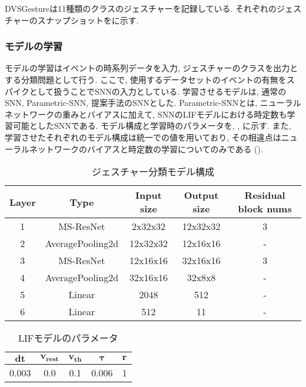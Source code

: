 DVSGestureは11種類のクラスのジェスチャーを記録している.
それぞれのジェスチャーのスナップショットをに示す.


\subsubsection{モデルの学習}
モデルの学習はイベントの時系列データを入力, ジェスチャーのクラスを出力とする分類問題として行う.
ここで, 使用するデータセットのイベントの有無をスパイクとして扱うことでSNNの入力としている.
学習させるモデルは, 通常のSNN, Parametric-SNN, 提案手法のSNNとした.
Parametric-SNNとは, ニューラルネットワークの重みとバイアスに加えて, SNNのLIFモデルにおける時定数も学習可能としたSNNである.
モデル構成と学習時のパラメータを, , に示す.
また, 学習させたそれぞれのモデル構成は統一での値を用いており, その相違点はニューラルネットワークのバイアスと時定数の学習についてのみである ().
\begin{table}[htb]
    \centering
    \caption{ジェスチャー分類モデル構成}
    \label{tab:exp2:model}
    \begin{tabular}{ccccc}
        \hline
        \textbf{Layer}& \textbf{Type}&\textbf{Input size} & \textbf{Output size} & \textbf{Residual block nums}\\
        \hline
        1   & MS-ResNet & 2x32x32 & 12x32x32 & 3\\
        2 & AveragePooling2d & 12x32x32 & 12x16x16 & - \\
        3 & MS-ResNet & 12x16x16 & 32x16x16 & 3\\
        4 & AveragePooling2d & 32x16x16 & 32x8x8 & - \\
        5 & Linear & 2048 & 512 & - \\
        6 & Linear & 512 & 11 & - \\
        \hline
    \end{tabular}
\end{table}

\begin{table}[htb]
    \centering
    \caption{LIFモデルのパラメータ}
    \label{tab:exp2:model:parameter:lif}
    \begin{tabular}{ccccc}
        \hline
        $\bm{dt}$& $\bm{v_{rest}}$ & $\bm{v_{th}}$ & $\bm{\tau}$ & $\bm{r}$\\
        \hline
        0.003   & 0.0 & 0.1 & 0.006 & 1 \\
        \hline
    \end{tabular}
\end{table}


